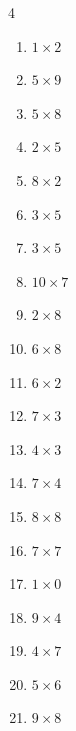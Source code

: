 \begin{multicols}{4}
\begin{enumerate}
  \item $1\times 2$
        \phantom{$=2$}

  \item $5\times 9$
        \phantom{$=45$}

  \item $5\times 8$
        \phantom{$=40$}

  \item $2\times 5$
        \phantom{$=10$}

  \item $8\times 2$
        \phantom{$=16$}

  \item $3\times 5$
        \phantom{$=15$}

  \item $3\times 5$
        \phantom{$=15$}

  \item $10\times 7$
        \phantom{$=70$}

  \item $2\times 8$
        \phantom{$=16$}

  \item $6\times 8$
        \phantom{$=48$}

  \item $6\times 2$
        \phantom{$=12$}

  \item $7\times 3$
        \phantom{$=21$}

  \item $4\times 3$
        \phantom{$=12$}

  \item $7\times 4$
        \phantom{$=28$}

  \item $8\times 8$
        \phantom{$=64$}

  \item $7\times 7$
        \phantom{$=49$}

  \item $1\times 0$
        \phantom{$=0$}

  \item $9\times 4$
        \phantom{$=36$}

\columnbreak %

  \item $4\times 7$
        \phantom{$=28$}

  \item $5\times 6$
        \phantom{$=30$}

  \item $9\times 8$
        \phantom{$=72$}


\end{enumerate}
\end{multicols}
